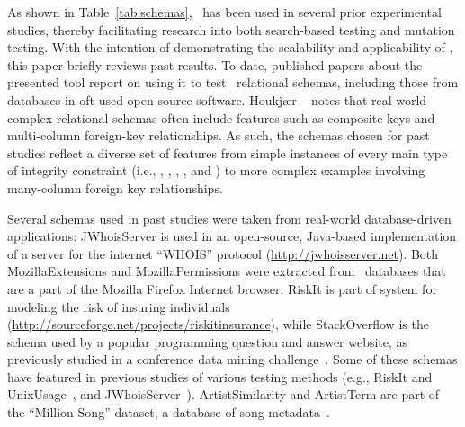 


As shown in Table~\ref{tab:schemas}, \sa~has been used in several prior experimental studies, thereby facilitating
research into both search-based testing and mutation testing. With the intention of demonstrating the scalability and
applicability of \sa, this paper briefly reviews past results. To date, published papers about the presented tool report
on using it to test \numtestedschemas~relational schemas, including those from databases in oft-used open-source
software. Houkj{\ae}r \etal~\cite{Houkjaer2006} notes that real-world complex relational schemas often include features
such as composite keys and multi-column foreign-key relationships. As such, the schemas chosen for past studies reflect
a diverse set of features from simple instances of every main type of integrity constraint (i.e., \PKCs, \FKCs,
\UCs, \NNCs, and \CCs) to more complex examples involving many-column foreign key relationships.

Several schemas used in past studies were taken from real-world database-driven applications: {JWhoisServer} is used in
an open-source, Java-based implementation of a server for the internet ``WHOIS'' protocol
(\url{http://jwhoisserver.net}).  Both {MozillaExtensions} and {MozillaPermissions} were extracted from
\SQLite~databases that are a part of the Mozilla Firefox Internet browser.  {RiskIt} is part of system for modeling the
risk of insuring individuals (\url{http://sourceforge.net/projects/riskitinsurance}), while {StackOverflow} is the
schema used by a popular programming question and answer website, as previously studied in a conference data mining
challenge~\cite{MSRChallenge2013}. Some of these schemas have featured in previous studies of various testing methods
(e.g., {RiskIt} and {UnixUsage}~\cite{Pan2011b}, and {JWhoisServer}~\cite{Cobb2011}).  {ArtistSimilarity} and
{ArtistTerm} are part of the ``Million Song'' dataset, a database of song metadata~\cite{Bertin-Mahieux2011}.

